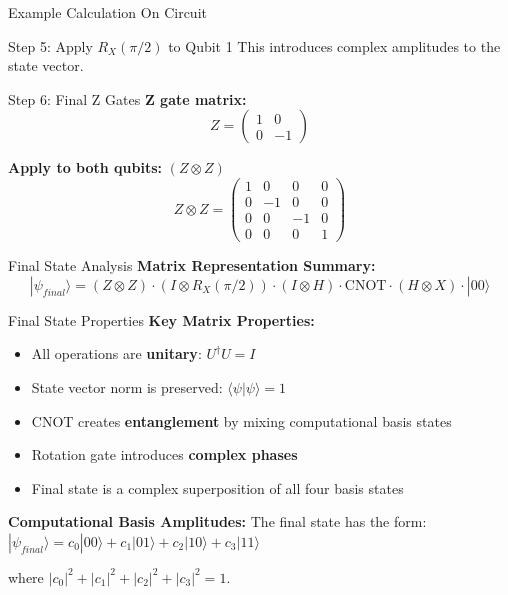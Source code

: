 \documentclass{beamer}
\begin{document}
\begin{frame}{Example Calculation On Circuit}
\begin{block}{Step 5: Apply $R_X(\pi/2)$ to Qubit 1}
        This introduces complex amplitudes to the state vector.
    \end{block}
    
    \framebreak
    
    \begin{block}{Step 6: Final Z Gates}
        \textbf{Z gate matrix:}
        \[
        Z = \begin{pmatrix} 1 & 0 \\ 0 & -1 \end{pmatrix}
        \]
        
        \textbf{Apply to both qubits:} $(Z \otimes Z)$
        \[
        Z \otimes Z = \begin{pmatrix} 
        1 & 0 & 0 & 0 \\ 
        0 & -1 & 0 & 0 \\ 
        0 & 0 & -1 & 0 \\ 
        0 & 0 & 0 & 1 
        \end{pmatrix}
        \]
    \end{block}
    
    \framebreak
    
    \begin{block}{Final State Analysis}
        \textbf{Matrix Representation Summary:}
        \[
        |\psi_{final}\rangle = (Z \otimes Z) \cdot (I \otimes R_X(\pi/2)) \cdot (I \otimes H) \cdot \text{CNOT} \cdot (H \otimes X) \cdot |00\rangle
        \]
    \end{block}
    \begin{block}{Final State Properties}
        \textbf{Key Matrix Properties:}
        \begin{itemize}
            \item All operations are \textbf{unitary}: $U^\dagger U = I$
            \item State vector norm is preserved: $\langle\psi|\psi\rangle = 1$
            \item CNOT creates \textbf{entanglement} by mixing computational basis states
            \item Rotation gate introduces \textbf{complex phases}
            \item Final state is a complex superposition of all four basis states
        \end{itemize}
        
        \textbf{Computational Basis Amplitudes:}
        The final state has the form: $|\psi_{final}\rangle = c_0|00\rangle + c_1|01\rangle + c_2|10\rangle + c_3|11\rangle$
        
        where $|c_0|^2 + |c_1|^2 + |c_2|^2 + |c_3|^2 = 1$.
    \end{block}
\end{frame}
\end{document}

